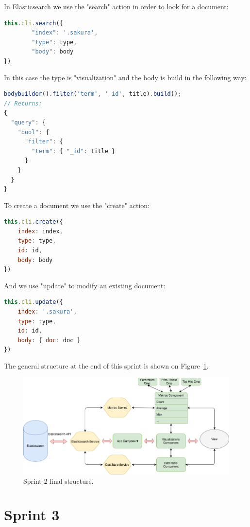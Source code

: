 \documentclass[a4paper, 12pt, english]{book}
\begin{document}
In Elasticsearch we use the "search" action in order to look for a document:
\begin{lstlisting}[language=javascript]
this.cli.search({
		"index": '.sakura',
		"type": type,
		"body": body
})
\end{lstlisting}

In this case the type is "visualization" and the body is build in the following way:
\begin{lstlisting}[language=javascript]
bodybuilder().filter('term', '_id', title).build();
// Returns:
{
  "query": {
    "bool": {
      "filter": {
        "term": { "_id": title }
      }
    }
  }
}
\end{lstlisting}

To create a document we use the "create" action:
\begin{lstlisting}[language=javascript]
this.cli.create({
	index: index,
	type: type,
	id: id,
	body: body
})
\end{lstlisting}

And we use "update" to modify an existing document:
\begin{lstlisting}[language=javascript]
this.cli.update({
	index: '.sakura',
	type: type,
	id: id,
	body: { doc: doc }
})
\end{lstlisting}

The general structure at the end of this sprint is shown on Figure~\ref{fig:sprint2-architecture-2}.
\begin{figure}
  \centering
  \includegraphics[width=13cm, keepaspectratio]{img/sprint2_architecture_2}
  \caption{Sprint 2 final structure.}
  \label{fig:sprint2-architecture-2}
\end{figure}


\section{Sprint 3}
\label{sec:sprint-3}
\end{document}
